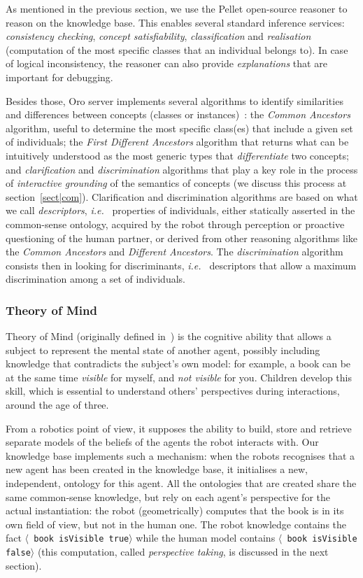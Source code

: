 \documentclass[preprint,3p,times]{elsarticle}
\newcommand{\stmt}[1]{{\footnotesize \tt $\langle$ #1\relax$\rangle$}}
\newcommand{\ie}{{\textit{i.e.\ }}}
\begin{document}
As mentioned in the previous section, we use the Pellet open-source reasoner to
reason on the knowledge base. This enables several standard inference services:
\emph{consistency checking}, \emph{concept satisfiability},
\emph{classification} and \emph{realisation} (computation of the most specific
classes that an individual belongs to). In case of logical inconsistency, the
reasoner can also provide \emph{explanations} that are important for debugging.

Besides those, {\sc Oro} server implements several algorithms to identify
similarities and differences between concepts (classes or
instances)~\cite{Ros2010b}: the \emph{Common Ancestors} algorithm, useful to
determine the most specific class(es) that include a given set of individuals;
the \emph{First Different Ancestors} algorithm that returns what can be
intuitively understood as the most generic types that \emph{differentiate} two
concepts; and \emph{clarification} and \emph{discrimination} algorithms that
play a key role in the process of \emph{interactive grounding} of the semantics
of concepts (we discuss this process at section~\ref{sect|com}). Clarification
and discrimination algorithms are based on what we call \emph{descriptors}, \ie
properties of individuals, either statically asserted in the common-sense
ontology, acquired by the robot through perception or proactive questioning of
the human partner, or derived from other reasoning algorithms like the
\emph{Common Ancestors} and \emph{Different Ancestors}. The
\emph{discrimination} algorithm consists then in looking for discriminants, \ie
descriptors that allow a maximum discrimination among a set of individuals.

\subsubsection{Theory of Mind}
\label{sect|tom}

Theory of Mind (originally defined in~\cite{Premack1978}) is the cognitive
ability that allows a subject to represent the mental state of another
agent, possibly including knowledge that contradicts the subject's own model: for
example, a book can be at the same time \emph{visible} for myself, and \emph{not
visible} for you. Children develop this skill, which is essential to understand others' perspectives during
interactions, around the age of three. 

From a robotics point of view, it supposes the ability to build, store and
retrieve separate models of the beliefs of the agents the robot interacts with.
Our knowledge base implements such a mechanism: when the robots recognises that
a new agent has been created in the knowledge base, it initialises a new,
independent, ontology for this agent. All the ontologies that are created share
the same common-sense knowledge, but rely on each agent's perspective for the
actual instantiation: the robot (geometrically) computes that the book is in its
own field of view, but not in the human one. The robot knowledge contains the
fact \stmt{book isVisible true} while the human model contains \stmt{book
isVisible false} (this computation, called \emph{perspective taking}, is
discussed in the next section).
\end{document}
